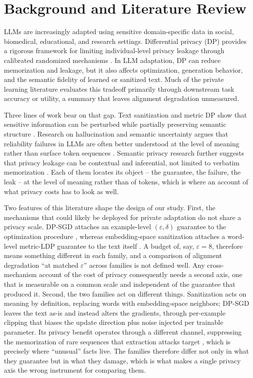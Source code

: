 \section{Background and Literature Review}
LLMs are increasingly adapted using sensitive domain-specific data in social,
biomedical,
educational,
and research settings.
Differential privacy (DP) provides a rigorous framework for limiting individual-level privacy leakage through calibrated randomized mechanisms \citep{dwork2006calibrating, dwork2014algorithmic}.
In LLM adaptation,
DP can reduce memorization and leakage,
but it also affects optimization,
generation behavior,
and the semantic fidelity of learned or sanitized text.
Much of the private learning literature evaluates this tradeoff primarily through downstream task accuracy or utility,
a summary that leaves alignment degradation unmeasured.

Three lines of work bear on that gap.
Text sanitization and metric DP show that sensitive information can be perturbed while partially preserving semantic structure \citep{chatzikokolakis2013broadening, carvalho2021tem, yue2021differential}.
Research on hallucination and semantic uncertainty argues that reliability failures in LLMs are often better understood at the level of meaning rather than surface token sequences \citep{farquhar2024detecting}.
Semantic privacy research further suggests that privacy leakage can be contextual and inferential,
not limited to verbatim memorization \citep{ma2025sok}.
Each of them locates its object -- the guarantee,
the failure,
the leak -- at the level of meaning rather than of tokens,
which is where an account of what privacy costs has to look as well.

Two features of this literature shape the design of our study.
First,
the mechanisms that could likely be deployed for private adaptation do not share a privacy scale.
DP-SGD attaches an example-level $(\varepsilon, \delta)$ guarantee to the optimization procedure \citep{abadi2016deep, mironov2017renyi},
whereas embedding-space sanitization attaches a word-level metric-LDP guarantee to the text itself \citep{chatzikokolakis2013broadening, feyisetan2020privacy, yue2021differential}.
A budget of,
say,
$\varepsilon = 8$,
therefore means something different in each family,
and a comparison of alignment degradation ``at matched $\varepsilon$'' across families is not defined well.
Any cross-mechanism account of the cost of privacy consequently needs a second axis,
one that is measurable on a common scale and independent of the guarantee that produced it.
Second,
the two families act on different things.
Sanitization acts on meaning by definition,
replacing words with embedding-space neighbors;
DP-SGD leaves the text as-is and instead alters the gradients,
through per-example clipping that biases the update direction plus noise injected per trainable parameter.
Its privacy benefit operates through a different channel,
suppressing the memorization of rare sequences that extraction attacks target \citep{carlini2021extracting},
which is precisely where ``unusual'' facts live.
The families therefore differ not only in what they guarantee but in what they damage,
which is what makes a single privacy axis the wrong instrument for comparing them.
